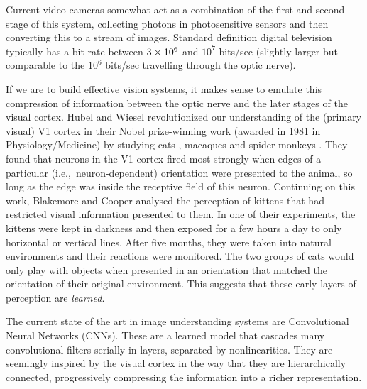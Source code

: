 Current video cameras somewhat act as a combination of the first and second
stage of this system, collecting photons in photosensitive sensors and then
converting this to a stream of images. Standard definition digital television
typically has
a bit rate between $3\times 10^6$ and $10^7$ bits/sec (slightly larger but comparable
to the $10^6$ bits/sec travelling through the optic nerve).

If we are to build effective vision systems, it makes sense to emulate this
compression of information between the optic nerve and the later stages of the visual
cortex.
Hubel and Wiesel revolutionized our understanding of the (primary visual) V1 cortex in their Nobel prize-winning work
(awarded in 1981 in Physiology/Medicine) by
studying cats \cite{hubel_receptive_1959, hubel_receptive_1962}, macaques and spider
monkeys \cite{hubel_receptive_1968}. They found that neurons in the V1 cortex fired
most strongly when edges of a particular (i.e.,\ neuron-dependent) orientation
were presented to the animal, so long as the edge was inside the receptive field of
this neuron.
Continuing on this work, Blakemore and Cooper \cite{blakemore_development_1970}
analysed the perception of kittens that had restricted visual information
presented to them.
In one of their experiments, the kittens were kept in darkness
and then exposed for a few hours a day to only horizontal or vertical lines.
After five months, they were taken into natural environments and their reactions
were monitored. The two groups of cats would only play with objects when
presented in an orientation that matched the orientation of their original
environment. This suggests that these early layers of perception are
\emph{learned}.

The current state of the art in image understanding systems are
Convolutional Neural Networks (CNNs). These are a learned model that
cascades many convolutional filters serially in layers, separated by
nonlinearities.
They are seemingly inspired by the visual cortex in the way that they are
hierarchically connected, progressively compressing the information into a
richer representation.

